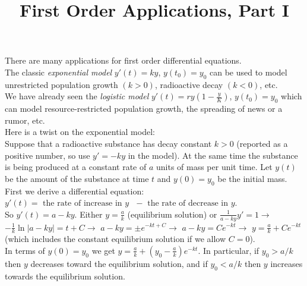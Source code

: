 \documentclass{ximera}
\begin{document}
\begin{abstract}
 \end{abstract}

    \title{First Order Applications, Part I}
    
    \maketitle

     There are many applications for first order differential equations. \\


 The classic \emph{exponential model} $y'(t)=ky$, $y(t_{0})=y_{0}$ can be used to model unrestricted population growth $(k>0)$, radioactive decay $(k<0)$, etc.\\

 We have already seen the \emph{logistic model} $y'(t)=ry\left(1-\frac{y}{K}\right)$, $y(t_{0})=y_{0}$ which can model resource-restricted population growth, the spreading of news or a rumor, etc.\\

 Here is a twist on the exponential model:  \\

 Suppose that a radioactive substance has decay constant $k>0$ (reported as a positive number, so use $y'=-ky$ in the model).  At the same time the substance is being produced at a constant rate of $a$ units of mass per unit time. Let $y(t)$ be the amount of the substance at time $t$ and $y(0)=y_{0}$ be the initial mass. \\

 First we derive a differential equation:  $y'(t)=\mbox{ the rate of increase in }y\mbox{ }-\mbox{ the rate of decrease in }y.$\\

 So $y'(t)=a-ky$.  Either $\displaystyle y=\frac{a}{k}$ (equilibrium solution) or  $\displaystyle \frac{1}{a-ky}y'=1\rightarrow$ \\  $\displaystyle -\frac{1}{k}\ln{|a-ky|}=t+C\rightarrow$  $\displaystyle a-ky=\pm e^{-kt+C}\rightarrow$  $\displaystyle a-ky=Ce^{-kt}\rightarrow$  $\displaystyle y=\frac{a}{k}+Ce^{-kt}$ \\(which includes the constant equilibrium solution if we allow $C=0$).\\

 In terms of $y(0)=y_0$ we get $\displaystyle y=\frac{a}{k}+\left(y_0-\frac{a}{k}\right)e^{-kt}$.  In particular, if $y_{0}>a/k$ then $y$ decreases toward the equilibrium solution, and if $y_{0}<a/k$ then $y$ increases towards the equilibrium solution.
\end{document}
